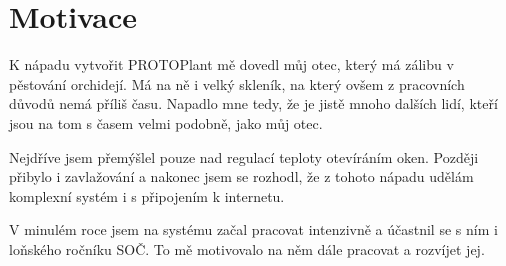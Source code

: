 \chapter{Motivace}
K nápadu vytvořit  PROTOPlant mě dovedl můj otec, který má zálibu v pěstování orchidejí.
Má na ně i velký skleník, na který ovšem z pracovních důvodů nemá příliš času.
Napadlo mne tedy, že je jistě mnoho dalších lidí, kteří jsou na tom s časem velmi podobně, jako můj otec.

Nejdříve jsem přemýšlel pouze nad regulací teploty otevíráním oken.
Později přibylo i zavlažování a nakonec jsem se rozhodl, že z tohoto nápadu udělám komplexní systém i s připojením k internetu.

V minulém roce jsem na systému začal pracovat intenzivně a účastnil se s ním i loňského ročníku SOČ.
To mě motivovalo na něm dále pracovat a rozvíjet jej.

\newpage